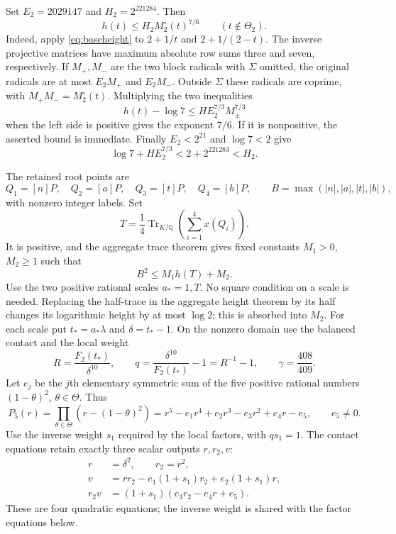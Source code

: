 \documentclass[11pt,a4paper]{article}
\newcommand{\Q}{\mathbb Q}\newcommand{\Z}{\mathbb Z}\newcommand{\HH}{\mathcal H}
\DeclareMathOperator{\Tr}{Tr}\DeclareMathOperator{\Nm}{Nm}
\begin{document}
Set $E_2=2029147$ and $H_2=2^{221284}$. Then
\begin{equation}\label{eq:contactheight}
                   h(t)\le H_2M_2^\circ(t)^{7/6}
                   \qquad(t\notin\Theta_2).
\end{equation}
Indeed, apply \eqref{eq:baseheight} to $2+1/t$ and $2+1/(2-t)$.
The inverse projective matrices have maximum absolute row sums three
and seven, respectively. If $M_+,M_-$ are the two block radicals
with $\Sigma$ omitted, the original radicals are at most $E_2M_+$
and $E_2M_-$. Outside $\Sigma$ these radicals are coprime, with
$M_+M_-=M_2^\circ(t)$. Multiplying the two inequalities
\[
             h(t)-\log7\le HE_2^{7/3}M_\pm^{7/3}
\]
when the left side is positive gives the exponent $7/6$.
If it is nonpositive, the asserted bound is immediate. Finally
$E_2<2^{21}$ and $\log7<2$ give
\[
                 \log7+HE_2^{7/3}<2+2^{221283}<H_2.
\]

The retained root points are
\[
 Q_1=[n]P,\quad Q_2=[a]P,\quad Q_3=[t]P,\quad Q_4=[b]P,
 \qquad B=\max(|n|,|a|,|t|,|b|),
\]
with nonzero integer labels. Set
\[
 T=\frac14\Tr_{K/\Q}\left(\sum_{i=1}^4x(Q_i)\right).
\]
It is positive, and the aggregate trace theorem gives fixed constants
$M_1>0$, $M_2\ge1$ such that
\begin{equation}\label{eq:aggregate}
                         B^2\le M_1h(T)+M_2.
\end{equation}
Use the two positive rational scales $a_*=1,T$. No square condition
on a scale is needed. Replacing the half-trace in the aggregate
height theorem by its half changes its logarithmic height by at
most $\log2$; this is absorbed into $M_2$.
For each scale put $t_*=a_*\lambda$ and $\delta=t_*-1$.
On the nonzero domain use the balanced contact and the local weight
\begin{equation}\label{eq:detector}
 R=\frac{F_2(t_*)}{\delta^{10}},\qquad
 q=\frac{\delta^{10}}{F_2(t_*)}-1=R^{-1}-1,
 \qquad \gamma=\frac{408}{409}.
\end{equation}
Let $e_j$ be the $j$th elementary symmetric sum of the five positive
rational numbers $(1-\theta)^2$, $\theta\in\Theta$. Thus
\[
 P_5(r)=\prod_{\theta\in\Theta}(r-(1-\theta)^2)
       =r^5-e_1r^4+e_2r^3-e_3r^2+e_4r-e_5,
 \qquad e_5\ne0.
\]
Use the inverse weight $s_1$ required by the local factors, with
$qs_1=1$. The contact equations retain exactly three scalar outputs
$r,r_2,v$:
\begin{equation}\label{eq:contactcircuit}
\begin{split}
 r&=\delta^2,\qquad r_2=r^2,\\
 v&=rr_2-e_1(1+s_1)r_2+e_2(1+s_1)r,\\
 r_2v&=(1+s_1)(e_3r_2-e_4r+e_5).
\end{split}
\end{equation}
These are four quadratic equations; the inverse weight is shared with
the factor equations below.
\end{document}
